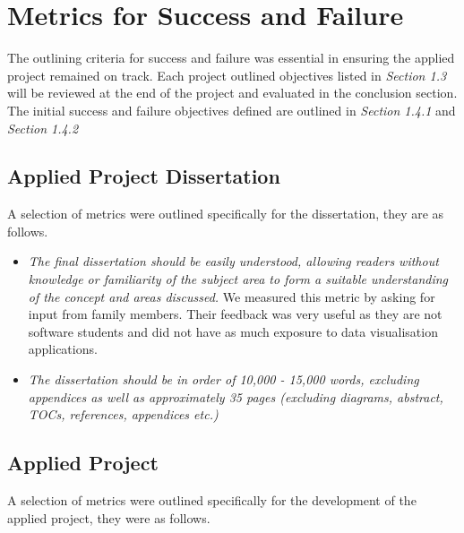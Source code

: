\section{Metrics for Success and Failure}
The outlining criteria for success and failure was essential in ensuring the applied project remained on track.  Each project outlined objectives listed in \emph{Section 1.3} will be reviewed at the end of the project and evaluated in the conclusion section. The initial success and failure objectives defined are outlined in \emph{Section 1.4.1} and \emph{Section 1.4.2}

\vspace{5mm} %

\subsection{Applied Project Dissertation}
A selection of metrics were outlined specifically for the dissertation, they are as follows.

\begin{itemize}

    \item \emph{The final dissertation should be easily understood, allowing readers without knowledge or familiarity of the subject area to form a suitable understanding of the concept and areas discussed.} We measured this metric by asking for input from family members. Their feedback was very useful as they are not software students and did not have as much exposure to data visualisation applications.

    \item \emph{The  dissertation should be in order of 10,000 - 15,000 words, excluding appendices as well as approximately 35 pages (excluding diagrams, abstract, TOCs, references, appendices etc.)}

\end{itemize}

\subsection{Applied Project}
A selection of metrics were outlined specifically for the development of the applied project, they were as follows.

